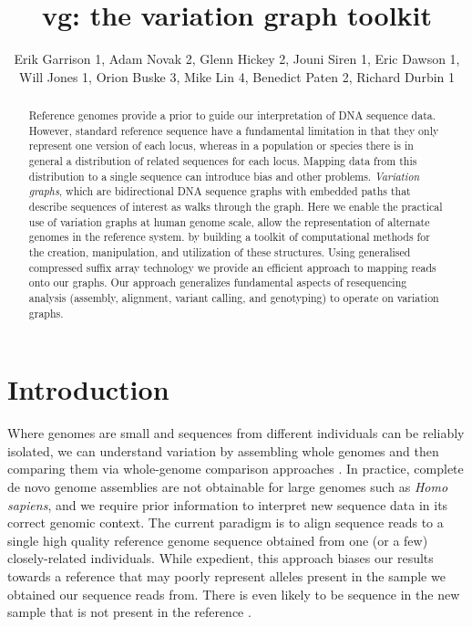 \documentclass[12pt]{article}
\begin{document}
\title{vg: the variation graph toolkit}

\author{Erik Garrison 1, Adam Novak 2, Glenn Hickey 2, Jouni Siren 1, Eric
  Dawson 1, Will Jones 1, Orion Buske 3, Mike Lin 4, Benedict Paten 2,
  Richard Durbin 1}

\maketitle

\begin{abstract}
Reference genomes provide a prior to guide our interpretation of DNA sequence data.
However, standard reference sequence have a fundamental limitation in that they only represent one version of each locus, whereas
in a population or species there is in general a distribution of related sequences for each locus.
Mapping data from this distribution to a single sequence can introduce bias and other problems.
\emph{Variation graphs}, which are bidirectional DNA sequence graphs with embedded paths that describe sequences of interest as walks through the graph.
Here we enable the practical use of variation graphs at human genome scale, allow the representation of alternate genomes in the reference system.
by building a toolkit of computational methods for the creation, manipulation, and utilization of these structures.
Using generalised compressed suffix array technology we provide an efficient approach to mapping reads onto our graphs.
Our approach generalizes fundamental aspects of resequencing analysis (assembly, alignment, variant calling, and genotyping) to operate on variation graphs.
\end{abstract}

\section{Introduction}

Where genomes are small and sequences from different individuals can be reliably isolated, we can understand variation by assembling whole genomes and then comparing them via whole-genome comparison approaches \cite{mummer}.
In practice, complete de novo genome assemblies are not obtainable for large genomes such as \emph{Homo sapiens}, and we require prior information to interpret new sequence data in its correct genomic context.  
The current paradigm is to align sequence reads to a single high quality reference genome sequence obtained from one (or a few)  closely-related individuals.  
While expedient, this approach biases our results towards a reference that may poorly represent alleles present in the sample we obtained our sequence reads from.  
There is even likely to be sequence in the new sample that is not present in the reference \cite{li2010building}.
\end{document}

